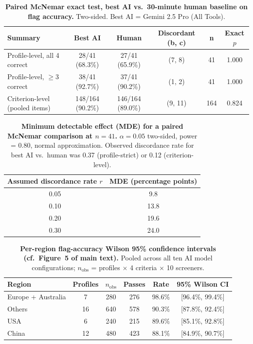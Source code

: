 \documentclass[12pt]{article}
\begin{document}
\begin{table}[H]
\centering
\caption{\textbf{Paired McNemar exact test, best AI vs.\ 30-minute human baseline on flag accuracy.} Two-sided. Best AI = Gemini 2.5 Pro (All Tools).}
\label{tab:mcnemar}
\small
\begin{tabular}{lccccc}
\toprule
\textbf{Summary} & \textbf{Best AI} & \textbf{Human} & \textbf{Discordant (b, c)} & \textbf{n} & \textbf{Exact $p$} \\
\midrule
Profile-level, all 4 correct   & 28/41 (68.3\%)  & 27/41 (65.9\%)  & (7, 8)   &  41 & 1.000 \\
Profile-level, $\geq$3 correct & 38/41 (92.7\%)  & 37/41 (90.2\%)  & (1, 2)   &  41 & 1.000 \\
Criterion-level (pooled items) & 148/164 (90.2\%)& 146/164 (89.0\%)& (9, 11)  & 164 & 0.824 \\
\bottomrule
\end{tabular}
\end{table}

\begin{table}[H]
\centering
\caption{\textbf{Minimum detectable effect (MDE) for a paired McNemar comparison at $n = 41$.} $\alpha = 0.05$ two-sided, power = 0.80, normal approximation. Observed discordance rate for best AI vs.\ human was 0.37 (profile-strict) or 0.12 (criterion-level).}
\label{tab:mde}
\small
\begin{tabular}{cc}
\toprule
\textbf{Assumed discordance rate $r$} & \textbf{MDE (percentage points)} \\
\midrule
0.05 &  9.8 \\
0.10 & 13.8 \\
0.20 & 19.6 \\
0.30 & 24.0 \\
\bottomrule
\end{tabular}
\end{table}

\begin{table}[H]
\centering
\caption{\textbf{Per-region flag-accuracy Wilson 95\% confidence intervals (cf.\ Figure~5 of main text).} Pooled across all ten AI model configurations; $n_\text{obs}$ = profiles $\times$ 4 criteria $\times$ 10 screeners.}
\label{tab:region}
\small
\begin{tabular}{lccccc}
\toprule
\textbf{Region} & \textbf{Profiles} & \textbf{$n_\text{obs}$} & \textbf{Passes} & \textbf{Rate} & \textbf{95\% Wilson CI} \\
\midrule
Europe + Australia &  7 & 280 & 276 & 98.6\% & [96.4\%, 99.4\%] \\
Others             & 16 & 640 & 578 & 90.3\% & [87.8\%, 92.4\%] \\
USA                &  6 & 240 & 215 & 89.6\% & [85.1\%, 92.8\%] \\
China              & 12 & 480 & 423 & 88.1\% & [84.9\%, 90.7\%] \\
\bottomrule
\end{tabular}
\end{table}
\end{document}
